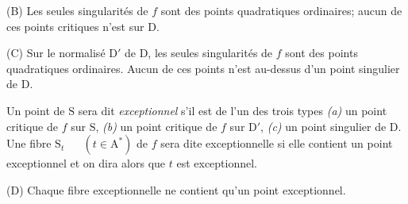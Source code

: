 \documentclass[11pt,leqno]{article}
\newcommand{\Page}[1]{\ifvmode\noindent\else\unskip\ \fi{\footnotesize\textcolor{gray}{[p.\,#1]}}\ \ignorespaces}
\begin{document}
(B) Les seules singularités de \(f\) sont des points quadratiques ordinaires; aucun de ces points critiques n’est sur \(\mathrm D\).

(C) Sur le normalisé \(\mathrm D'\) de \(\mathrm D\), les seules singularités de \(f\) sont des points quadratiques ordinaires. Aucun de ces points n’est au-dessus d’un point singulier de \(\mathrm D\).

Un point de \(\mathrm S\) sera dit \textit{exceptionnel} s’il est de l’un des trois types \textit{(a)} un point critique de \(f\) sur \(\mathrm S\), \textit{(b)} un point critique de \(f\) sur \(\mathrm D'\), \textit{(c)} un point singulier de \(\mathrm D\). Une fibre \(\mathrm S_t\)
\Page{198}
\((t\in\mathrm A^*)\) de \(f\) sera dite exceptionnelle si elle contient un point exceptionnel et on dira alors que \(t\) est exceptionnel.

(D) Chaque fibre exceptionnelle ne contient qu’un point exceptionnel.
\end{document}
